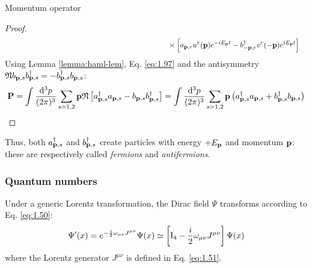 \begin{proposition}{Momentum operator}{}
\begin{proof}
\begin{equation*}
\begin{split}
        & \qquad \qquad \qquad \qquad \qquad \qquad \qquad \qquad \qquad \qquad \qquad \times \left[ a_{\mathbf{p},r} u^r(\mathbf{p}) e^{-i E_{\mathbf{p}} t} - b_{-\mathbf{p},r}^\dagger v^r(-\mathbf{p}) e^{i E_{\mathbf{p}} t} \right]
      \end{split}
    \end{equation*}
    Using Lemma \ref{lemma:haml-lem}, Eq. \ref{eq:1.97} and the antisymmetry $ \mathfrak{N} b_{\mathbf{p},s} b_{\mathbf{p},s}^\dagger = - b_{\mathbf{p},s}^\dagger b_{\mathbf{p},s} $:
    \begin{equation*}
      \mathbf{P} = \int \frac{\mathrm{d}^3p}{(2\pi)^3} \sum_{s = 1,2} \mathbf{p} \mathfrak{N} \left[ a_{\mathbf{p},s}^\dagger a_{\mathbf{p},s} - b_{\mathbf{p},s} b_{\mathbf{p},s}^\dagger \right] = \int \frac{\mathrm{d}^3p}{(2\pi)^3} \sum_{s = 1,2} \mathbf{p} \left( a_{\mathbf{p},s}^\dagger a_{\mathbf{p},s} + b_{\mathbf{p},s}^\dagger b_{\mathbf{p},s} \right)
    \end{equation*}
  \end{proof}
\end{proposition}

Thus, both $ a_{\mathbf{p},s}^\dagger $ and $ b_{\mathbf{p},s}^\dagger $ create particles with energy $ +E_{\mathbf{p}} $ and momentum $ \mathbf{p} $: these are respectively called \textit{fermions} and \textit{antifermions}.

\subsubsection{Quantum numbers}

Under a generic Lorentz transformation, the Dirac field $ \Psi $ transforms according to Eq. \ref{eq:1.50}:
\begin{equation}
  \Psi'(x) = e^{-\frac{i}{2} \omega_{\mu \nu} J^{\mu \nu}} \Psi(x) \simeq \left[ \mathrm{I}_4 - \frac{i}{2} \omega_{\mu \nu} J^{\mu \nu} \right] \Psi(x)
  \label{eq:2.25}
\end{equation}
where the Lorentz generator $ J^{\mu \nu} $ is defined in Eq. \ref{eq:1.51}.

